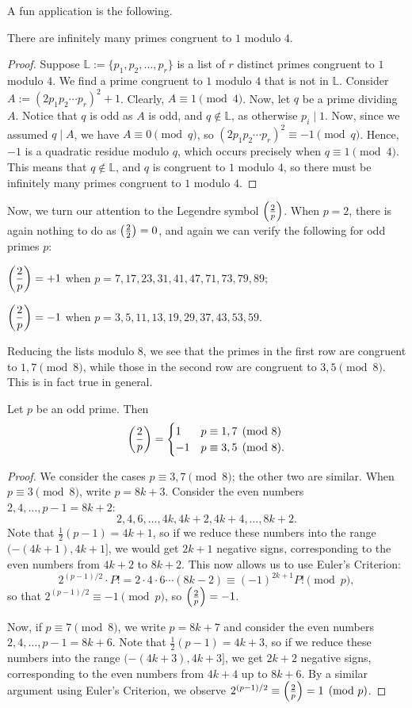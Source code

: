\documentclass{article}
\newcommand{\leg}[2]{\paren{\frac{#1}{#2}}}
\begin{document}
A fun application is the following.
\begin{theorem}
There are infinitely many primes congruent to $1$ modulo $4$.
\end{theorem}
\begin{proof}
Suppose $\mathbb L := \{p_1, p_2, \ldots, p_r\}$ is a list of $r$ distinct primes congruent to $1$ modulo $4$. We find a prime congruent to $1$ modulo $4$ that is not in $\mathbb L$. Consider $A := (2p_1p_2\cdots p_r)^2 + 1$. Clearly, $A\equiv 1\pmod 4$. Now, let $q$ be a prime dividing $A$. Notice that $q$ is odd as $A$ is odd, and $q\not\in \mathbb L$, as otherwise $p_i \mid 1$. Now, since we assumed $q\mid A$, we have $A\equiv 0\pmod q$, so $(2p_1p_2\cdots p_r)^2 \equiv -1\pmod q$. Hence, $-1$ is a quadratic residue modulo $q$, which occurs precisely when $q\equiv 1\pmod 4$. This means that $q\not\in \mathbb L$, and $q$ is congruent to $1$ modulo $4$, so there must be infinitely many primes congruent to $1$ modulo $4$.
\end{proof}

Now, we turn our attention to the Legendre symbol $\leg 2p$. When $p=2$, there is again nothing to do as $\leg 22 = 0$, and again we can verify the following for odd primes $p$:
\begin{center}
    $\ds\leg 2p = +1$ when $p = 7, 17, 23, 31, 41, 47, 71, 73, 79, 89;$
    
    $\ds\leg 2p = -1$ when $p = 3, 5, 11, 13, 19, 29, 37, 43, 53, 59.$
\end{center}
Reducing the lists modulo $8$, we see that the primes in the first row are congruent to $1,7\pmod 8$, while those in the second row are congruent to $3,5\pmod 8$. This is in fact true in general.
\begin{theorem}
Let $p$ be an odd prime. Then
$$\leg2p = \begin{cases}
    1 & p\equiv 1, 7\pmod 8\\ -1 & p\equiv 3,5\pmod 8.
\end{cases}$$
\begin{proof}
We consider the cases $p\equiv 3, 7 \pmod 8$; the other two are similar. When $p\equiv 3\pmod 8$, write $p = 8k+3$. Consider the even numbers $2, 4, \ldots, p-1 = 8k+2$:
$$2, 4, 6, \ldots, 4k, 4k+2, 4k+4, \ldots, 8k+2.$$
Note that $\frac 12(p-1) = 4k+1$, so if we reduce these numbers into the range $(-(4k+1), 4k+1]$, we would get $2k+1$ negative signs, corresponding to the even numbers from $4k+2$ to $8k+2$. This now allows us to use Euler's Criterion:
$$2^{(p-1)/2} \cdot P! = 2\cdot 4\cdot 6 \cdots (8k-2) \equiv (-1)^{2k+1} P! \pmod p,$$
so that $2^{(p-1)/2} \equiv -1\pmod p$, so $\leg 2p = -1$.

Now, if $p\equiv 7\pmod 8$, we write $p= 8k+7$ and consider the even numbers $2, 4, \ldots, p-1 = 8k+6$. Note that $\frac 12(p-1) = 4k+3$, so if we reduce these numbers into the range $(-(4k+3), 4k+3]$, we get $2k+2$ negative signs, corresponding to the even numbers from $4k+4$ up to $8k+6$. By a similar argument using Euler's Criterion, we observe $2^{(p-1)/2} \equiv \leg 2p = 1 \pmod p$.
\end{proof}
\end{theorem}
\end{document}
